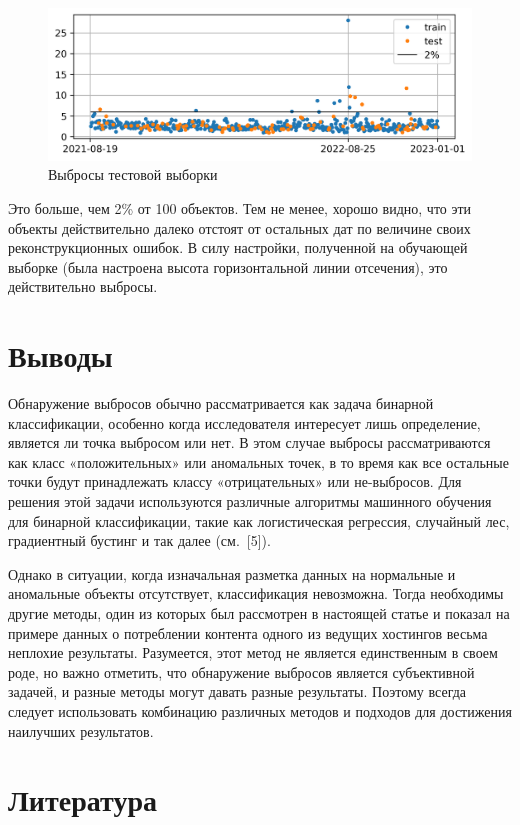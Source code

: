 \documentclass[a4paper,12pt]{article}
\begin{document}
\begin{figure}[!h]
	\centering
	\includegraphics[width=0.9\linewidth]{pictures/test}
	\caption{Выбросы тестовой выборки}
\end{figure}
Это больше, чем 2\% от 100 объектов. Тем не менее, хорошо видно, что эти объекты действительно далеко отстоят от остальных дат по величине своих реконструкционных ошибок. В силу настройки, полученной на обучающей выборке (была настроена высота горизонтальной линии отсечения), это действительно выбросы.


\section{Выводы}

Обнаружение выбросов обычно рассматривается как задача бинарной классификации, особенно когда исследователя интересует лишь определение, является ли точка выбросом или нет. В этом случае выбросы рассматриваются как класс «положительных» или аномальных точек, в то время как все остальные точки будут принадлежать классу «отрицательных» или не-выбросов. Для решения этой задачи используются различные алгоритмы машинного обучения для бинарной классификации, такие как логистическая регрессия, случайный лес, градиентный бустинг и так далее (см. [5]).

Однако в ситуации, когда изначальная разметка данных на нормальные и аномальные объекты отсутствует, классификация невозможна. Тогда необходимы другие методы, один из которых был рассмотрен в настоящей статье и показал на примере данных о потреблении контента одного из ведущих хостингов весьма неплохие результаты. Разумеется, этот метод не является единственным в своем роде, но важно отметить, что обнаружение выбросов является субъективной задачей, и разные методы могут давать разные результаты. Поэтому всегда следует использовать комбинацию различных методов и подходов для достижения наилучших результатов.

\section{Литература}
\end{document}
